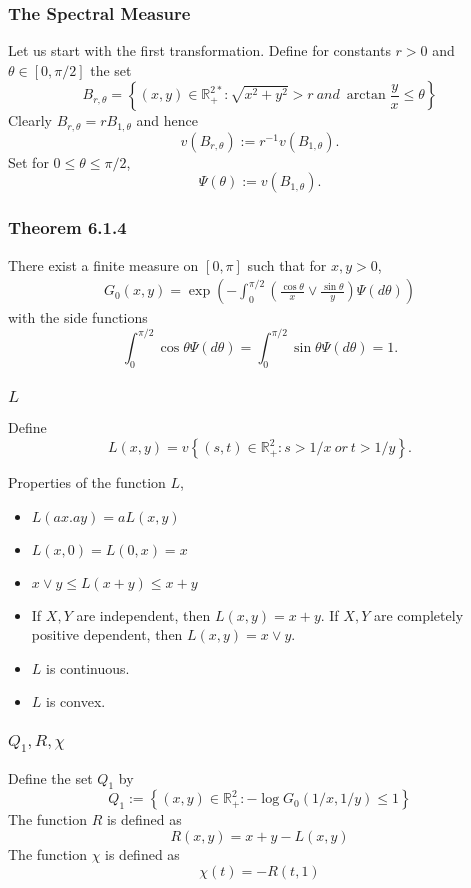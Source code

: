 \documentclass{beamer}
\newcommand{\suit}[1]{\left(#1\right)}
\newcommand{\set}[1]{\left\{#1\right\}}
\begin{document}
\begin{frame}
    \frametitle{The Spectral Measure}
    Let  us  start  with  the first transformation.  Define  for  constants $r>0$ and $\theta \in [0,\pi/2]$ the set
    $$
B_{r,\theta}=\set{(x,y)\in \mathbb{R}_{+}^{2*}: \sqrt{x^2+y^2}>r \ and \ \arctan \frac{y}{x}\le \theta}
    $$
    Clearly $B_{r,\theta}=rB_{1,\theta}$ and hence 
    $$
v(B_{r,\theta}):=r^{-1} v(B_{1,\theta}).
    $$
Set for $0\le \theta \le \pi/2$,
$$
\Psi(\theta):=v(B_{1,\theta}).
$$
\end{frame}

\begin{frame}
    \frametitle{Theorem 6.1.4}
There exist a finite measure on $[0,\pi]$ such that for $x,y>0$,
$$
\begin{aligned}
    G_0(x,y)=\exp\suit{-\int_0^{\pi/2}\suit{\frac{\cos \theta}{x}\lor \frac{\sin \theta}{y}}\Psi(d \theta)}
\end{aligned}
$$
with the side functions
$$
\int_{0}^{\pi/2}\cos \theta \Psi(d\theta)=\int_{0}^{\pi/2}\sin \theta \Psi(d\theta)=1.
$$
    

\end{frame}


\begin{frame}
    \frametitle{$L$}
Define 
$$
L(x,y)=v\set{(s,t)\in \mathbb{R}_{+}^2:s>1/x \ or \ t>1/y}.
$$
 
Properties of the function $L$,
\begin{itemize}
    \item $L(ax.ay)=aL(x,y)$
    \item $L(x,0)=L(0,x)=x$
    \item $x\lor y \le L(x+y)\le x+y$
    \item If $X,Y$ are independent, then $L(x,y)=x+y$. If $X,Y$ are completely positive dependent, then $L(x,y)=x\lor y$.
    \item $L$ is continuous.
    \item $L$ is convex.
\end{itemize}

\end{frame}


\begin{frame}
    \frametitle{$Q_1, R, \chi$}
Define the set $Q_1$ by 
$$
Q_1:=\set{(x,y)\in\mathbb{R}_{+}^2:-\log G_0(1/x,1/y)\le 1}
$$
The function $R$ is defined as 
$$
R(x,y)=x+y-L(x,y)
$$
The function $\chi$ is defined as 
$$
\chi(t)=-R(t,1)
$$
    

\end{frame}
\end{document}
